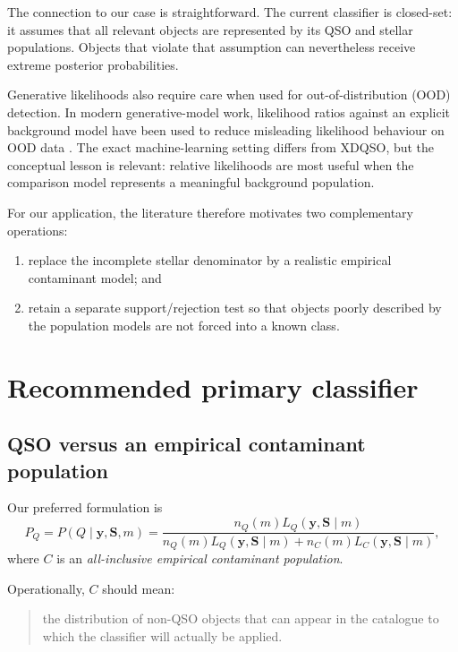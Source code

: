 \documentclass[11pt]{article}
\begin{document}
The connection to our case is straightforward. The current classifier is
closed-set: it assumes that all relevant objects are represented by its QSO
and stellar populations. Objects that violate that assumption can nevertheless
receive extreme posterior probabilities.

Generative likelihoods also require care when used for
out-of-distribution (OOD) detection. In modern generative-model work,
likelihood ratios against an explicit background model have been used to
reduce misleading likelihood behaviour on OOD data
\citep{ren2019}. The exact machine-learning setting differs from XDQSO, but
the conceptual lesson is relevant: relative likelihoods are most useful when
the comparison model represents a meaningful background population.

For our application, the literature therefore motivates two complementary
operations:

\begin{enumerate}[label=(\arabic*)]
\item replace the incomplete stellar denominator by a realistic empirical
contaminant model; and
\item retain a separate support/rejection test so that objects poorly
described by the population models are not forced into a known class.
\end{enumerate}

\section{Recommended primary classifier}

\subsection{QSO versus an empirical contaminant population}

Our preferred formulation is
%
\begin{equation}
P_Q
=
P(Q\mid\bm{y},\bm{S},m)
=
\frac{
n_Q(m)L_Q(\bm{y},\bm{S}\mid m)
}{
n_Q(m)L_Q(\bm{y},\bm{S}\mid m)
+
n_C(m)L_C(\bm{y},\bm{S}\mid m)
},
\label{eq:qcont}
\end{equation}
%
where $C$ is an \emph{all-inclusive empirical contaminant population}.

Operationally, $C$ should mean:

\begin{quote}
the distribution of non-QSO objects that can appear in the catalogue to
which the classifier will actually be applied.
\end{quote}
\end{document}
